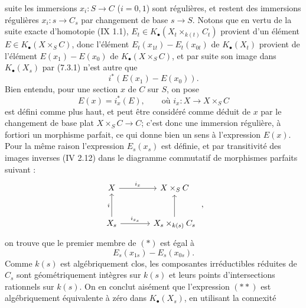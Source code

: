 
suite les immersions \(x_i:S\to C\) (\(i=0,1\)) sont régulières, et restent des immersions régulières \(x_i:s\to C_s\) par changement de base \(s\to S\). Notons que en vertu de la suite exacte d'homotopie (IX 1.1), \(E_t\in K_\bullet(X_t\times_{k(t)}C_t)\) provient d'un élément \(E\in K_\bullet(X\times_SC)\), donc l'élément \(E_t(x_{1t})-E_t(x_{0t})\) de \(K_\bullet(X_t)\) provient de l'élément \(E(x_1)-E(x_0)\) de \(K_\bullet(X\times_SC)\), et par suite son image dans \(K_\bullet(X_s)\) par (7.3.1) n'est autre que
\[
  i^*(E(x_1)-E(x_0)).
  \tag{*}
\]
Bien entendu, pour une section \(x\) de \(C\) sur \(S\), on pose
\[
  E(x)=i_x^*(E),\qquad\text{où } i_x:X\longrightarrow X\times_SC
\]
est défini comme plus haut, et peut être considéré comme déduit de \(x\) par le changement de base plat \(X\times_SC\to C\); c'est donc une immersion régulière, à fortiori un morphisme parfait, ce qui donne bien un sens à l'expression \(E(x)\). Pour la même raison l'expression \(E_s(x_s)\) est définie, et par transitivité des images inverses (IV 2.12) dans le diagramme commutatif de morphismes parfaits suivant :
\[
\begin{tikzcd}[column sep=large,row sep=large]
X \arrow[r,"i_x"] & X\times_SC\\
X_s \arrow[u,"i"] \arrow[r,"i_{x_s}"] & X_s\times_{k(s)}C_s \arrow[u]
\end{tikzcd}
\;,
\]
on trouve que le premier membre de \((*)\) est égal à
\[
  E_s(x_{1s})-E_s(x_{0s}).
  \tag{**}
\]
Comme \(k(s)\) est algébriquement clos, les composantes irréductibles réduites de \(C_s\) sont géométriquement intègres sur \(k(s)\) et leurs points d'intersections rationnels sur \(k(s)\). On en conclut aisément que l'expression \((**)\) est algébriquement équivalente à zéro dans \(K_\bullet(X_s)\), en utilisant la connexité
